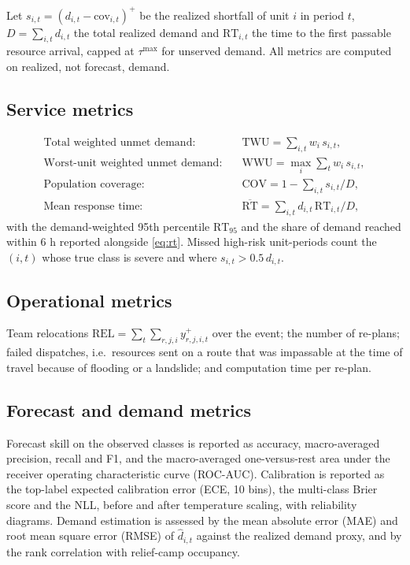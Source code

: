 \documentclass[pdflatex,sn-basic]{sn-jnl}
\theoremstyle{plain}%
\theoremstyle{remark}%
\theoremstyle{definition}%
\begin{document}
Let $s_{i,t} = (d_{i,t} - \mathrm{cov}_{i,t})^{+}$ be the realized shortfall of unit $i$ in period $t$, $D = \sum_{i,t} d_{i,t}$ the total realized demand and $\mathrm{RT}_{i,t}$ the time to the first passable resource arrival, capped at $\tau^{\max}$ for unserved demand. All metrics are computed on realized, not forecast, demand.

\subsection{Service metrics}

\begin{align}
\text{Total weighted unmet demand:}\quad & \mathrm{TWU} = \textstyle\sum_{i,t} w_i\, s_{i,t}, \label{eq:twu}\\
\text{Worst-unit weighted unmet demand:}\quad & \mathrm{WWU} = \textstyle\max_i \sum_{t} w_i\, s_{i,t}, \label{eq:wwu}\\
\text{Population coverage:}\quad & \mathrm{COV} = 1 - \textstyle\sum_{i,t} s_{i,t} / D, \label{eq:cov}\\
\text{Mean response time:}\quad & \overline{\mathrm{RT}} = \textstyle\sum_{i,t} d_{i,t}\, \mathrm{RT}_{i,t} / D, \label{eq:rt}
\end{align}
with the demand-weighted 95th percentile $\mathrm{RT}_{95}$ and the share of demand reached within 6 h reported alongside \eqref{eq:rt}. Missed high-risk unit-periods count the $(i,t)$ whose true class is severe and where $s_{i,t} > 0.5\, d_{i,t}$.

\subsection{Operational metrics}
 Team relocations $\mathrm{REL} = \sum_t \sum_{r,j,i} y^{+}_{r,j,i,t}$ over the event; the number of re-plans; failed dispatches, i.e.\ resources sent on a route that was impassable at the time of travel because of flooding or a landslide; and computation time per re-plan.

\subsection{Forecast and demand metrics}

Forecast skill on the observed classes is reported as accuracy, macro-averaged precision, recall and F1, and the macro-averaged one-versus-rest area under the receiver operating characteristic curve (ROC-AUC). Calibration is reported as the top-label expected calibration error (ECE, 10 bins), the multi-class Brier score and the NLL, before and after temperature scaling, with reliability diagrams. Demand estimation is assessed by the mean absolute error (MAE) and root mean square error (RMSE) of $\hat d_{i,t}$ against the realized demand proxy, and by the rank correlation with relief-camp occupancy.
\end{document}
